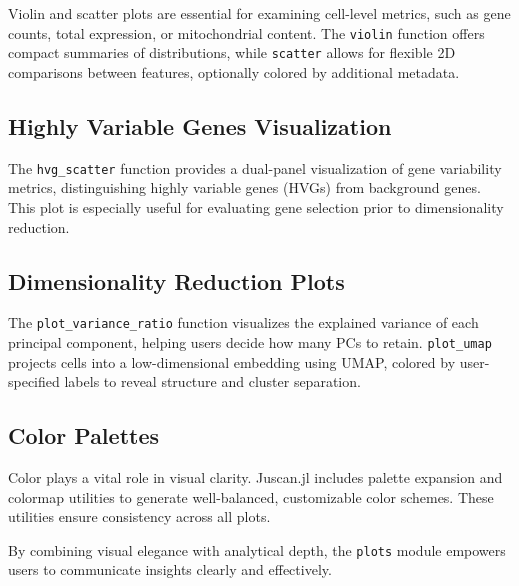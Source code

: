 \documentclass[oneside]{memoir}
\begin{document}
Violin and scatter plots are essential for examining cell-level metrics, such as gene counts, total expression, or mitochondrial content. The \texttt{violin} function offers compact summaries of distributions, while \texttt{scatter} allows for flexible 2D comparisons between features, optionally colored by additional metadata.



\subsection{Highly Variable Genes Visualization}



\label{6407616420908144000}{}


The \texttt{hvg\_scatter} function provides a dual-panel visualization of gene variability metrics, distinguishing highly variable genes (HVGs) from background genes. This plot is especially useful for evaluating gene selection prior to dimensionality reduction.



\subsection{Dimensionality Reduction Plots}



\label{112643527740029953}{}


The \texttt{plot\_variance\_ratio} function visualizes the explained variance of each principal component, helping users decide how many PCs to retain. \texttt{plot\_umap} projects cells into a low-dimensional embedding using UMAP, colored by user-specified labels to reveal structure and cluster separation.



\subsection{Color Palettes}



\label{6686870057159581818}{}


Color plays a vital role in visual clarity. Juscan.jl includes palette expansion and colormap utilities to generate well-balanced, customizable color schemes. These utilities ensure consistency across all plots.



By combining visual elegance with analytical depth, the \texttt{plots} module empowers users to communicate insights clearly and effectively.
\end{document}
